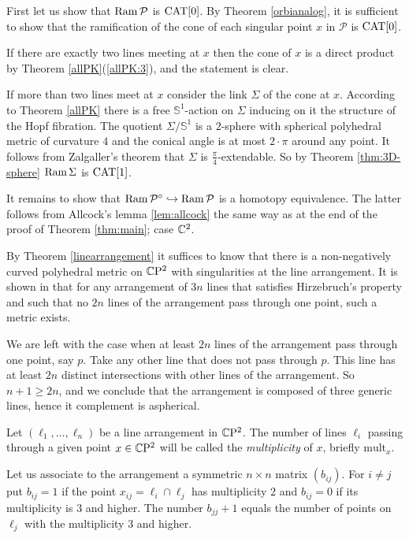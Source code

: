 \documentclass[oneside,a4paper]{article}
\def\Ram{\mathop{\rm Ram}\nolimits}
\def\SS{\mathbb{S}}
\begin{document}
First let us show that $\Ram \mathcal P$ is $\mathrm{CAT}[0]$.
By Theorem \ref{orbianalog},
it is sufficient to show that the ramification of the cone of each singular point $x$ in $\mathcal P$ is $\mathrm{CAT}[0]$.

If there are exactly two lines meeting at $x$ then the cone of $x$ is a direct product by Theorem \ref{allPK}(\ref{allPK:3}),
and the statement is clear.

If  more than two lines meet at $x$ consider the link $\Sigma$
of the cone at $x$. According to Theorem \ref{allPK} there is a free $\SS^1$-action on $\Sigma$
inducing on it the structure of the Hopf fibration.
The quotient $\Sigma/\SS^1$ is a $2$-sphere
with spherical polyhedral metric of curvature $4$
and the conical angle is at most $2\cdot\pi$
around any point.
It follows from Zalgaller's theorem
that $\Sigma$ is $\frac{\pi}{4}$-extendable. So by Theorem \ref{thm:3D-sphere}
$\Ram \Sigma$ is $\mathrm{CAT}[1]$.

It remains to show that $\Ram \mathcal P^{\circ}\hookrightarrow \Ram \mathcal P$ is a homotopy equivalence.
The latter follows from Allcock's lemma \ref{lem:allcock}
the same way as at the end of the proof of Theorem  \ref{thm:main}; case $\mathbb{C}^2$.
\qeds



 By Theorem \ref {linearrangement}
it suffices to know that there is a
non-negatively curved polyhedral metric on $\mathbb{C}\mathrm{P}^2$ with singularities
at the line arrangement. 
It is shown in \cite{panov} that for any arrangement of $3n$ lines that satisfies Hirzebruch's property and such that no $2n$ lines of the arrangement pass through one point,
such a metric exists. 

We are left with the case when at least $2n$ lines of the arrangement pass through one point, say $p$. Take any other line that does not pass through $p$. This line has at least $2n$ distinct intersections with other lines of the arrangement. So $n+1\ge 2n$, and we conclude that the arrangement is composed of three generic lines, hence it complement is aspherical.
\qeds

Let $(\ell_1,\dots,\ell_n)$ be a line arrangement in $\mathbb{C}\mathrm{P}^2$.
The number of lines $\ell_i$ passing through a given point $x\in\mathbb{C}\mathrm{P}^2$
will be called the \emph{multiplicity} of $x$, briefly
\def\mult{\mathrm{mult}}
$\mult_x$.

Let us associate to the arrangement a symmetric $n\times n$ matrix $(b_{ij})$.
For $i\ne j$
put $b_{ij}=1$ if the point $x_{ij}= \ell_i\cap \ell_j$
has multiplicity $2$
and $b_{ij}=0$ if its multiplicity is $3$ and higher.
The number $b_{jj}+1$ equals the number of points on $\ell_j$ with the multiplicity $3$ and higher.
\end{document}
